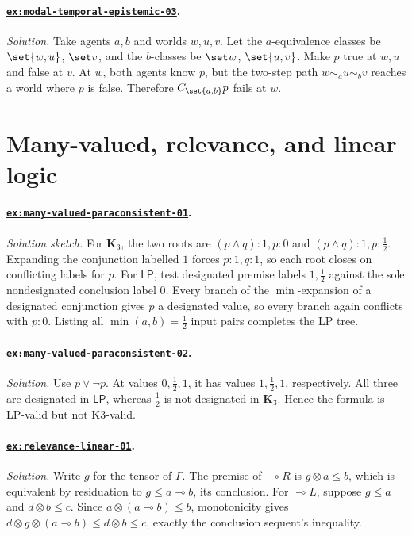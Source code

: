 \paragraph{\hyperref[ex:modal-temporal-epistemic-03]{\texttt{ex:modal-temporal-epistemic-03}}.}
\textit{Solution.}  Take agents \(a,b\) and worlds \(w,u,v\).  Let the
\(a\)-equivalence classes be \(\set{w,u}\), \(\set v\), and the
\(b\)-classes be \(\set w\), \(\set{u,v}\).  Make \(p\) true at \(w,u\) and
false at \(v\).  At \(w\), both agents know \(p\), but the two-step path
\(w\sim_a u\sim_b v\) reaches a world where \(p\) is false.  Therefore
\(C_{\set{a,b}}p\) fails at \(w\).

\section{Many-valued, relevance, and linear logic}

\paragraph{\hyperref[ex:many-valued-paraconsistent-01]{\texttt{ex:many-valued-paraconsistent-01}}.}
\textit{Solution sketch.}  For \(\mathbf K_3\), the two roots are
\((p\land q){:}1,p{:}0\) and
\((p\land q){:}1,p{:}\tfrac12\).  Expanding the conjunction labelled \(1\)
forces \(p{:}1,q{:}1\), so each root closes on conflicting labels for \(p\).
For \(\mathsf{LP}\), test designated premise labels \(1,\tfrac12\) against
the sole nondesignated conclusion label \(0\).  Every branch of the
\(\min\)-expansion of a designated conjunction gives \(p\) a designated
value, so every branch again conflicts with \(p{:}0\).  Listing all
\(\min(a,b)=\tfrac12\) input pairs completes the LP tree.

\paragraph{\hyperref[ex:many-valued-paraconsistent-02]{\texttt{ex:many-valued-paraconsistent-02}}.}
\textit{Solution.}  Use \(p\lor\neg p\).  At values \(0,\tfrac12,1\), it has
values \(1,\tfrac12,1\), respectively.  All three are designated in
\(\mathsf{LP}\), whereas \(\tfrac12\) is not designated in
\(\mathbf K_3\).  Hence the formula is LP-valid but not K3-valid.

\paragraph{\hyperref[ex:relevance-linear-01]{\texttt{ex:relevance-linear-01}}.}
\textit{Solution.}  Write \(g\) for the tensor of \(\Gamma\).  The premise of
\(\multimap R\) is \(g\otimes a\leq b\), which is equivalent by residuation to
\(g\leq a\multimap b\), its conclusion.  For \(\multimap L\), suppose
\(g\leq a\) and \(d\otimes b\leq c\).  Since
\(a\otimes(a\multimap b)\leq b\), monotonicity gives
\(d\otimes g\otimes(a\multimap b)\leq d\otimes b\leq c\), exactly the
conclusion sequent's inequality.

